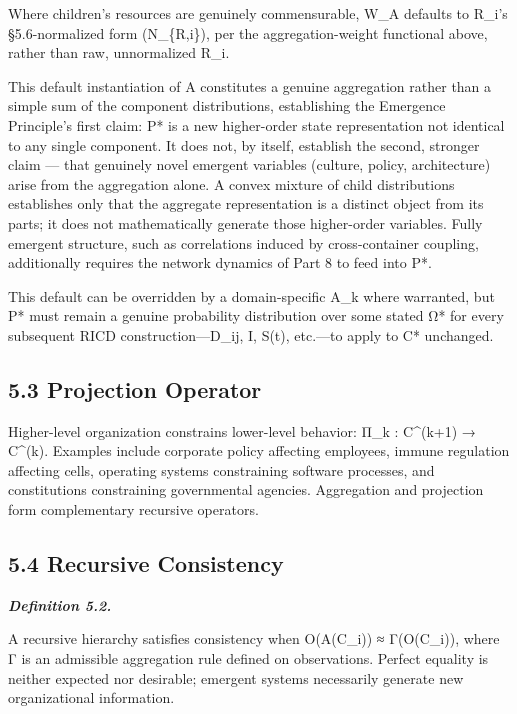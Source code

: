 \documentclass[
]{article}
\begin{document}
Where children's resources are genuinely commensurable, W\_A defaults to
R\_i's §5.6-normalized form (N\_\{R,i\}), per the aggregation-weight
functional above, rather than raw, unnormalized R\_i.

This default instantiation of A constitutes a genuine aggregation rather
than a simple sum of the component distributions, establishing the
Emergence Principle's first claim: P* is a new higher-order state
representation not identical to any single component. It does not, by
itself, establish the second, stronger claim --- that genuinely novel
emergent variables (culture, policy, architecture) arise from the
aggregation alone. A convex mixture of child distributions establishes
only that the aggregate representation is a distinct object from its
parts; it does not mathematically generate those higher-order variables.
Fully emergent structure, such as correlations induced by
cross-container coupling, additionally requires the network dynamics of
Part 8 to feed into P*.

This default can be overridden by a domain-specific A\_k where
warranted, but P* must remain a genuine probability distribution over
some stated Ω* for every subsequent RICD construction---D\_ij, I, S(t),
etc.---to apply to C* unchanged.

\hypertarget{projection-operator}{%
\subsection{5.3 Projection Operator}\label{projection-operator}}

Higher-level organization constrains lower-level behavior: Π\_k :
C\^{}(k+1) → C\^{}(k). Examples include corporate policy affecting
employees, immune regulation affecting cells, operating systems
constraining software processes, and constitutions constraining
governmental agencies. Aggregation and projection form complementary
recursive operators.

\hypertarget{recursive-consistency}{%
\subsection{5.4 Recursive Consistency}\label{recursive-consistency}}

\emph{\textbf{Definition 5.2.}}

A recursive hierarchy satisfies consistency when O(A(C\_i)) ≈
Γ(O(C\_i)), where Γ is an admissible aggregation rule defined on
observations. Perfect equality is neither expected nor desirable;
emergent systems necessarily generate new organizational information.
\end{document}
